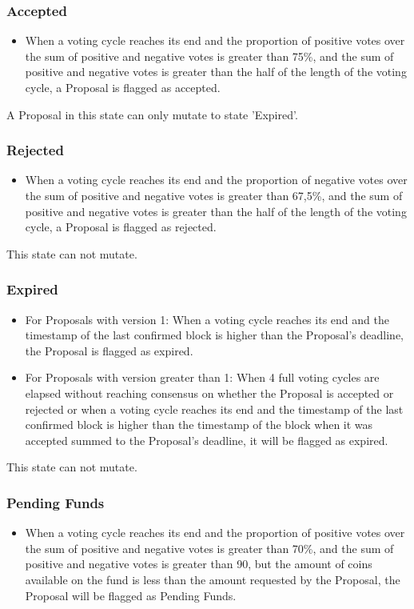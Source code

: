\documentclass{artikel1}
\begin{document}
\begin{flushleft}
\subsubsection{Accepted}
\begin{itemize}
\item When a voting cycle reaches its end and the proportion of positive votes over the sum of positive and negative votes is greater than 75\%, and the sum of positive and negative votes is greater than the half of the length of the voting cycle, a Proposal is flagged as accepted.
\end{itemize}

A Proposal in this state can only mutate to state 'Expired'.
\subsubsection{Rejected}
\begin{itemize}
\item When a voting cycle reaches its end and the proportion of negative votes over the sum of positive and negative votes is greater than 67,5\%, and the sum of positive and negative votes is greater than the half of the length of the voting cycle, a Proposal is flagged as rejected.
\end{itemize}

This state can not mutate.
\subsubsection{Expired}
\begin{itemize}
\item For Proposals with version 1: When a voting cycle reaches its end and the timestamp of the last confirmed block is higher than the Proposal's deadline, the Proposal is flagged as expired.
\item For Proposals with version greater than 1: When 4 full voting cycles are elapsed without reaching consensus on whether the Proposal is accepted or rejected or when a voting cycle reaches its end and the timestamp of the last confirmed block is higher than the timestamp of the block when it was accepted summed to the Proposal's deadline, it will be flagged as expired.
\end{itemize}
This state can not mutate.
\subsubsection{Pending Funds}
\begin{itemize}
\item When a voting cycle reaches its end and the proportion of positive votes over the sum of positive and negative votes is greater than 70\%, and the sum of positive and negative votes is greater than 90,  but the amount of coins available on the fund is less than the amount requested by the Proposal, the Proposal will be flagged as Pending Funds.
\end{itemize}


\end{flushleft}
\end{document}
